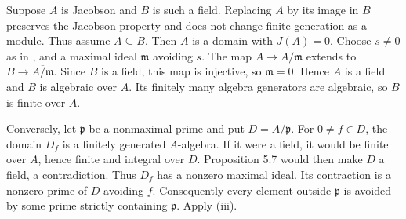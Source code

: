 Suppose $A$ is Jacobson and $B$ is such a field. Replacing $A$ by its image in $B$ preserves the Jacobson property and does not change finite generation as a module. Thus assume $A\subseteq B$. Then $A$ is a domain with $J(A)=0$. Choose $s\neq0$ as in , and a maximal ideal $\mathfrak{m}$ avoiding $s$. The map $A\to A/\mathfrak{m}$ extends to $B\to\overline{A/\mathfrak{m}}$. Since $B$ is a field, this map is injective, so $\mathfrak{m}=0$. Hence $A$ is a field and $B$ is algebraic over $A$. Its finitely many algebra generators are algebraic, so $B$ is finite over $A$.

Conversely, let $\mathfrak{p}$ be a nonmaximal prime and put $D=A/\mathfrak{p}$. For $0\neq f\in D$, the domain $D_f$ is a finitely generated $A$-algebra. If it were a field, it would be finite over $A$, hence finite and integral over $D$. Proposition 5.7 would then make $D$ a field, a contradiction. Thus $D_f$ has a nonzero maximal ideal. Its contraction is a nonzero prime of $D$ avoiding $f$. Consequently every element outside $\mathfrak{p}$ is avoided by some prime strictly containing $\mathfrak{p}$. Apply (iii).

